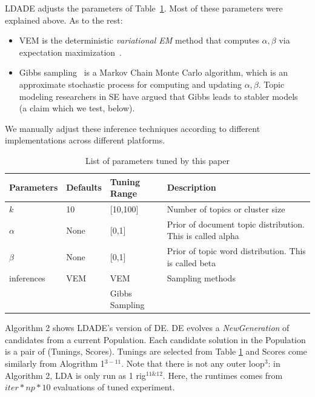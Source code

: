 \documentclass[10pt,conference]{IEEEtran}
\newcommand{\bi}{\begin{itemize}}
\newcommand{\ei}{\end{itemize}}
\theoremstyle{break}
\begin{document}
LDADE  adjusts the parameters of
Table~\ref{tb:tuned}. Most of these parameters were explained above. As to the rest:
\bi
\item VEM is the deterministic {\em variational EM} method that computes $\alpha,\beta$ via
  expectation maximization~\cite{minka2002expectation}.
\item Gibbs sampling~\cite{wei2006lda, griffiths2004finding} is a Markov Chain Monte Carlo algorithm, which is an approximate stochastic process for computing and updating $\alpha,\beta$.
  Topic modeling researchers in SE have argued that Gibbs leads to stabler models~\cite{layman16a,layman2016topic} (a claim which we test, below).
  \ei

We manually adjust these inference techniques according to different implementations across different platforms.

\begin{table}[!htbp]
    \begin{center}
{\scriptsize
\begin{tabular}{|l|l|l|p{3.5cm}|}
        \hline 
        \textbf{Parameters} & \textbf{Defaults} & \textbf{Tuning Range} & \textbf{Description}\\
        \hline
        $k$ & 10 & [10,100] & Number of topics or cluster size \\ 
        \hline
       $\alpha$ & None & [0,1] & Prior of document topic distribution. This is called alpha \\ 
        \hline
        $\beta$ & None & [0,1] & Prior of topic word distribution. This is called  beta \\

        \hline
        inferences  & VEM & VEM    & Sampling methods \\
                  &     & Gibbs Sampling &\\
        \hline
\end{tabular}
}
\end{center}
\caption{List of parameters tuned by this paper}
\label{tb:tuned}
\end{table}

Algorithm 2 shows LDADE's version of DE.  DE evolves a \textit{NewGeneration} of
candidates from a current Population.   Each candidate solution in the Population is a pair of
(Tunings, Scores). Tunings are selected from Table \ref{tb:tuned} and Scores
come similarly from Alogrithm 1$^{3-11}$. Note that there is not any outer loop$^{3}$: in Algorithm 2, LDA is only run as 1 rig$^{11 \& 12}$. Here, the runtimes comes from $\mathit{iter} * np * 10$ evaluations of tuned experiment.
\end{document}
